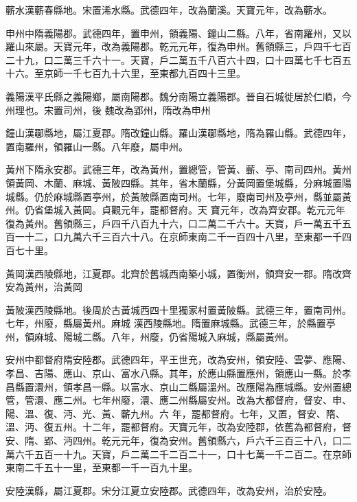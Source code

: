 \begin{pinyinscope}
 蘄水漢蘄春縣地。宋置浠水縣。武德四年，改為蘭溪。天寶元年，改為蘄水。



 申州中隋義陽郡。武德四年，置申州，領義陽、鐘山二縣。八年，省南羅州，又以羅山來屬。天寶元年，改為義陽郡。乾元元年，復為申州。舊領縣三，戶四千七百二十九，口二萬三千六十一。天寶，戶二萬五千八百六十四，口十四萬七千七百五十六。至京師一千七百九十六里，至東都九百四十三里。



 義陽漢平氏縣之義陽鄉，屬南陽郡。魏分南陽立義陽郡。晉自石城徙居於仁順，今州理也。宋置司州，後
 魏改為郢州，隋改為申州



 鐘山漢鄳縣地，屬江夏郡。隋改鐘山縣。羅山漢鄳縣地，隋為羅山縣。武德四年，置南羅州，領羅山一縣。八年廢，屬申州。



 黃州下隋永安郡。武德三年，改為黃州，置總管，管黃、蘄、亭、南司四州。黃州領黃岡、木蘭、麻城、黃陂四縣。其年，省木蘭縣，分黃岡置堡城縣，分麻城置陽城縣。仍於麻城縣置亭州，於黃陂縣置南司州。七年，廢南司州及亭州，縣並屬黃州。仍省堡城入黃岡。貞觀元年，罷都督府。天
 寶元年，改為齊安郡。乾元元年復為黃州。舊領縣三，戶四千八百九十六，口二萬二千六十。天寶，戶一萬五千五百一十二，口九萬六千三百六十八。在京師東南二千一百四十八里，至東都一千四百七十里。



 黃岡漢西陵縣地，江夏郡。北齊於舊城西南築小城，置衡州，領齊安一郡。隋改齊安為黃州，治黃岡



 黃陂漢西陵縣地。後周於古黃城西四十里獨家村置黃陂縣。武德三年，置南司州。七年，州廢，縣屬黃州。麻城
 漢西陵縣地。隋置麻城縣。武德三年，於縣置亭州，領麻城、陽城二縣。八年，州廢，仍省陽城入麻城，縣屬黃州。



 安州中都督府隋安陸郡。武德四年，平王世充，改為安州，領安陸、雲夢、應陽、孝昌、吉陽、應山、京山、富水八縣。其年，於應山縣置應州，領應山一縣。於孝昌縣置澴州，領孝昌一縣。以富水、京山二縣屬溫州。改應陽為應城縣。安州置總管，管澴、應二州。七年州廢，澴、應二州縣屬安州。改為大都督府，督安、申、陽、溫、復、沔、光、黃、蘄九州。六
 年，罷都督府。七年，又置，督安、隋、溫、沔、復五州。十二年，罷都督府。天寶元年，改為安陸郡，依舊為都督府，督安、隋、郢、沔四州。乾元元年，復為安州。舊領縣六，戶六千三百三十八，口二萬六千五百一十九。天寶，戶二萬二千二百二十一，口十七萬一千二百二。在京師東南二千五十一里，至東都一千一百九十里。



 安陸漢縣，屬江夏郡。宋分江夏立安陸郡。武德四年，改為安州，治於安陸。




\end{pinyinscope}
